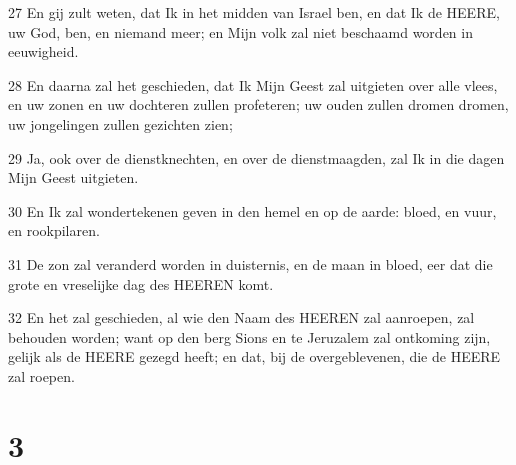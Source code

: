\par 27 En gij zult weten, dat Ik in het midden van Israel ben, en dat Ik de HEERE, uw God, ben, en niemand meer; en Mijn volk zal niet beschaamd worden in eeuwigheid.
\par 28 En daarna zal het geschieden, dat Ik Mijn Geest zal uitgieten over alle vlees, en uw zonen en uw dochteren zullen profeteren; uw ouden zullen dromen dromen, uw jongelingen zullen gezichten zien;
\par 29 Ja, ook over de dienstknechten, en over de dienstmaagden, zal Ik in die dagen Mijn Geest uitgieten.
\par 30 En Ik zal wondertekenen geven in den hemel en op de aarde: bloed, en vuur, en rookpilaren.
\par 31 De zon zal veranderd worden in duisternis, en de maan in bloed, eer dat die grote en vreselijke dag des HEEREN komt.
\par 32 En het zal geschieden, al wie den Naam des HEEREN zal aanroepen, zal behouden worden; want op den berg Sions en te Jeruzalem zal ontkoming zijn, gelijk als de HEERE gezegd heeft; en dat, bij de overgeblevenen, die de HEERE zal roepen.

\chapter{3}

